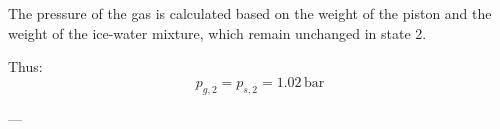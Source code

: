 The pressure of the gas is calculated based on the weight of the piston and the weight of the ice-water mixture, which remain unchanged in state 2.  

Thus:  
\[
p_{g,2} = p_{s,2} = 1.02 \, \text{bar}
\]  

---